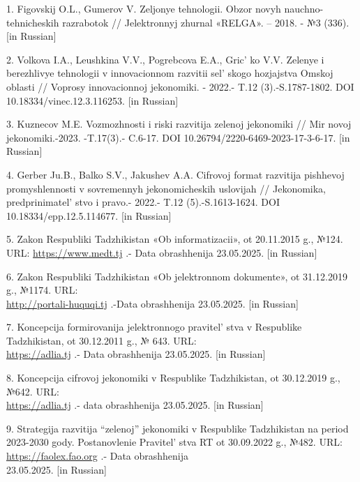 \begin{references}
1. Figovskij O.L., Gumerov V. Zeljonye tehnologii. Obzor novyh
nauchno-tehnicheskih razrabotok // Jelektronnyj zhurnal «RELGA». --
2018. - №3 (336). {[}in Russian{]}

2. Volkova I.A., Leushkina V.V., Pogrebcova E.A., Gric' ko
V.V. Zelenye i berezhlivye tehnologii v innovacionnom razvitii
sel' skogo hozjajstva Omskoj oblasti // Voprosy
innovacionnoj jekonomiki. - 2022.- T.12 (3).-S.1787-1802. DOI
10.18334/vinec.12.3.116253. {[}in Russian{]}

3. Kuznecov M.E. Vozmozhnosti i riski razvitija zelenoj jekonomiki // Mir
novoj jekonomiki.-2023. -T.17(3).- C.6-17. DOI
10.26794/2220-6469-2023-17-3-6-17. {[}in Russian{]}

4. Gerber Ju.B., Balko S.V., Jakushev A.A. Cifrovoj format razvitija
pishhevoj promyshlennosti v sovre\-mennyh jekonomicheskih uslovijah //
Jekonomika, predprinimatel' stvo i pravo.- 2022.- T.12
(5).-S.1613-1624. DOI 10.18334/epp.12.5.114677. {[}in Russian{]}

5. Zakon Respubliki Tadzhikistan «Ob informatizacii», ot 20.11.2015 g.,
№124. URL:
\href{https://www.medt.tj/documents/main/normativno-pravovie-akti/zakonodatelnie-akti/ru/02518-ru.pdf}{https://www.medt.tj} .-
Data obrashhenija 23.05.2025. {[}in Russian{]}

6. Zakon Respubliki Tadzhikistan «Ob jelektronnom dokumente», ot
31.12.2019 g., №1174. URL:\\
\href{http://portali-huquqi.tj/publicadliya/view\_qonunhoview.php/showdetail=\&asosi\_id=1763}{http://portali-huquqi.tj}
.-Data obrashhenija 23.05.2025. {[}in Russian{]}

7. Koncepcija formirovanija jelektronnogo pravitel' stva v
Respublike Tadzhikistan, ot 30.12.2011 g., № 643. URL:\\
\href{https://adlia.tj/show\_doc.fwx?rgn=116092}{https://adlia.tj} .- Data obrashhenija
23.05.2025. {[}in Russian{]}

8. Koncepcija cifrovoj jekonomiki v Respublike Tadzhikistan, ot
30.12.2019 g., №642. URL: \\\href{https://adlia.tj/show\_doc.fwx?rgn=135392}{https://adlia.tj} .-
data obrashhenija 23.05.2025. {[}in Russian{]}

9. Strategija razvitija ``zelenoj'' jekonomiki v Respublike Tadzhikistan
na period 2023-2030 gody. Postan\-ovlenie Pravitel' stva RT
ot 30.09.2022 g., №482. URL:
\href{https://faolex.fao.org/docs/pdf/taj221507.pdf}{https://faolex.fao.org} .- Data obrashhenija\\
23.05.2025. {[}in Russian{]}
\end{references}

